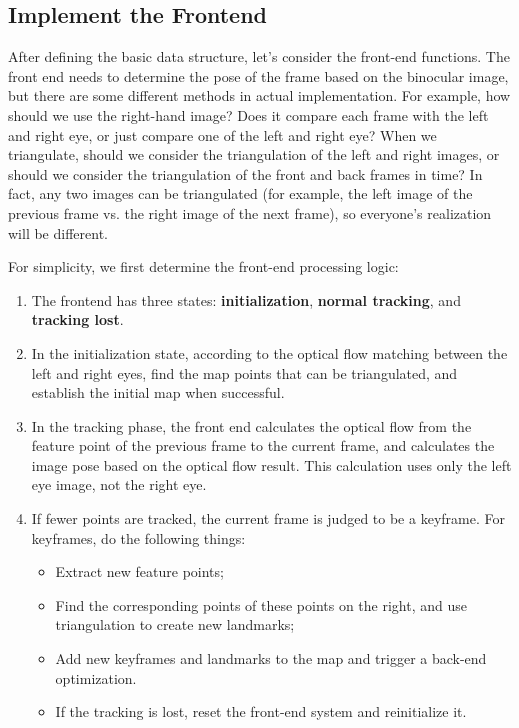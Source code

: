 \subsection{Implement the Frontend}
After defining the basic data structure, let's consider the front-end functions. The front end needs to determine the pose of the frame based on the binocular image, but there are some different methods in actual implementation. For example, how should we use the right-hand image? Does it compare each frame with the left and right eye, or just compare one of the left and right eye? When we triangulate, should we consider the triangulation of the left and right images, or should we consider the triangulation of the front and back frames in time? In fact, any two images can be triangulated (for example, the left image of the previous frame vs. the right image of the next frame), so everyone's realization will be different.

For simplicity, we first determine the front-end processing logic:
\begin{enumerate}
	\item The frontend has three states: \textbf{initialization}, \textbf{normal tracking}, and \textbf{tracking lost}.
	\item In the initialization state, according to the optical flow matching between the left and right eyes, find the map points that can be triangulated, and establish the initial map when successful.
	\item In the tracking phase, the front end calculates the optical flow from the feature point of the previous frame to the current frame, and calculates the image pose based on the optical flow result. This calculation uses only the left eye image, not the right eye.
	\item If fewer points are tracked, the current frame is judged to be a keyframe. For keyframes, do the following things:
	
	\begin{itemize}
		\item Extract new feature points;
		\item Find the corresponding points of these points on the right, and use triangulation to create new landmarks;
		\item Add new keyframes and landmarks to the map and trigger a back-end optimization.
		\item If the tracking is lost, reset the front-end system and reinitialize it.
	\end{itemize}
\end{enumerate}

